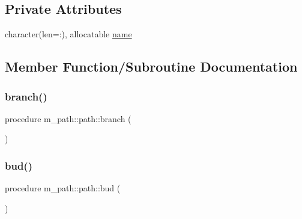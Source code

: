 \subsection*{Private Attributes}
\begin{DoxyCompactItemize}
\item 
character(len=\+:), allocatable \mbox{\hyperlink{structm__path_1_1path_a1d9f6aad306106e1032d44c175b80dc4}{name}}
\end{DoxyCompactItemize}


\subsection{Member Function/\+Subroutine Documentation}
\mbox{\label{structm__path_1_1path_a51ab53ea8780aa950701aa63de109bb5}} 
\subsubsection{\texorpdfstring{branch()}{branch()}}
{\footnotesize\ttfamily procedure m\+\_\+path\+::path\+::branch (\begin{DoxyParamCaption}{ }\end{DoxyParamCaption})\hspace{0.3cm}{\ttfamily [private]}}

\mbox{\label{structm__path_1_1path_a461f618573516bd745e802f829db588a}} 
\subsubsection{\texorpdfstring{bud()}{bud()}}
{\footnotesize\ttfamily procedure m\+\_\+path\+::path\+::bud (\begin{DoxyParamCaption}{ }\end{DoxyParamCaption})\hspace{0.3cm}{\ttfamily [private]}}

\mbox{\label{structm__path_1_1path_ae5fad3370033619ca8935281119a38de}} 
